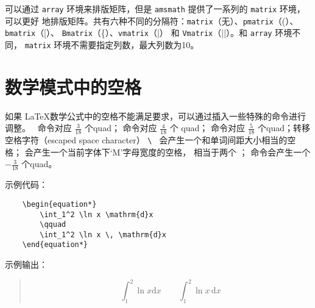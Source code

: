 \documentclass[UTF8]{ctexart}
\begin{document}
可以通过 \texttt{array} 环境来排版矩阵，但是 \texttt{amsmath} 提供了一系列的 \texttt{matrix} 环境，可以更好
地排版矩阵。共有六种不同的分隔符：\texttt{matrix}（无）、\texttt{pmatrix}（(）、\texttt{bmatrix}（[）、
\texttt{Bmatrix}（\{）、\texttt{vmatrix}（|） 和 \texttt{Vmatrix}（||）。和 \texttt{array} 环境不同，
\texttt{matrix} 环境不需要指定列数，最大列数为10。

\section{数学模式中的空格}
如果 \LaTeX 数学公式中的空格不能满足要求，可以通过插入一些特殊的命令进行调整。\texttt{\,} 命令对应
$\frac{3}{18}$ 个quad；\texttt{\:} 命令对应 $\frac{4}{18}$ 个 quad；
\texttt{\;} 命令对应 $\frac{5}{18}$ 个quad；转移空格字符（escaped space character）
\verb*|\ | 会产生一个和单词间距大小相当的空格；\texttt{\quad} 会产生一个当前字体下‘M’字母宽度的空格，
\texttt{\qquad} 相当于两个 \texttt{\quad}；\texttt{\!}
命令会产生一个$-\frac{3}{18}$ 个quad。

示例代码：
\begin{verbatim}
    \begin{equation*}
        \int_1^2 \ln x \mathrm{d}x
        \qquad
        \int_1^2 \ln x \, \mathrm{d}x
    \end{equation*}
\end{verbatim}

示例输出：
\begin{quote}
    \begin{equation*}
        \int_1^2 \ln x \mathrm{d}x
        \qquad
        \int_1^2 \ln x \, \mathrm{d}x
    \end{equation*}
\end{quote}
\end{document}
